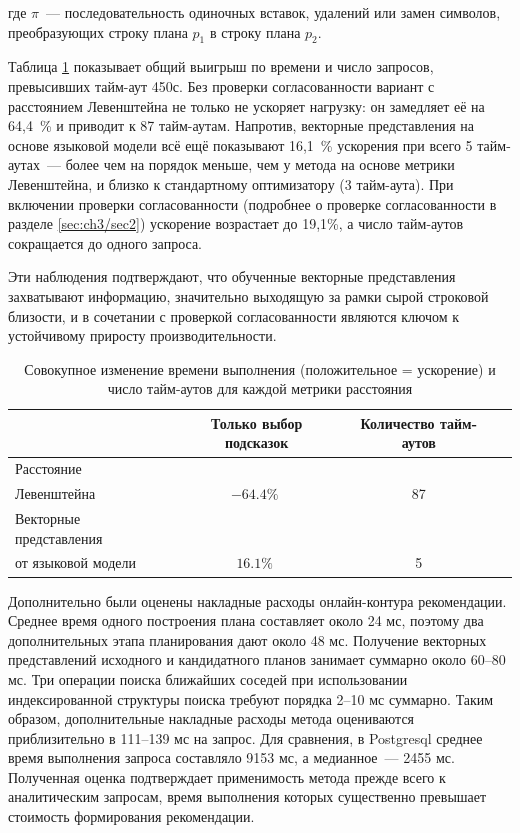 где $\pi$~--- последовательность одиночных вставок, удалений или замен символов, преобразующих строку плана $p_{1}$ в строку плана $p_{2}$.  

Таблица \ref{tab:ablation-latency} показывает общий выигрыш по времени и число запросов, превысивших тайм-аут 450с.
Без проверки согласованности вариант с расстоянием Левенштейна не только не ускоряет нагрузку: он замедляет её на 64{,}4~\% и приводит к 87 тайм-аутам.
Напротив, векторные представления на основе языковой модели всё ещё показывают 16{,}1~\% ускорения при всего 5 тайм-аутах~--- более чем на порядок меньше, чем у метода на основе метрики Левенштейна, и близко к стандартному оптимизатору (3 тайм-аута).
При включении проверки согласованности (подробнее о проверке согласованности в разделе \ref{sec:ch3/sec2}) ускорение возрастает до 19{,}1\%, а число тайм-аутов сокращается до одного запроса.

Эти наблюдения подтверждают, что обученные векторные представления захватывают информацию, значительно выходящую за рамки сырой строковой близости, и в сочетании с проверкой согласованности являются ключом к устойчивому приросту производительности.

\begin{table}[htbp]
  \centering

  \caption{Совокупное изменение времени выполнения (положительное = ускорение) и число тайм-аутов для каждой метрики расстояния}
  \begin{tabular}{lccc}
    \toprule
                     & Только выбор подсказок
                     & Количество тайм-аутов \\
    \midrule
    Расстояние \\ Левенштейна      & $-64.4\%\;$
                     & 87  \\[2pt]
    Векторные представления \\ от языковой модели   & $16.1\%\;$
                     & 5  \\
    \bottomrule
  \end{tabular}


    \label{tab:ablation-latency}
\end{table}

Дополнительно были оценены накладные расходы онлайн-контура рекомендации. Среднее время одного построения плана составляет около 24 мс, поэтому два дополнительных этапа планирования дают около 48 мс. Получение векторных представлений исходного и кандидатного планов занимает суммарно около 60--80 мс. Три операции поиска ближайших соседей при использовании индексированной структуры поиска требуют порядка 2--10 мс суммарно. Таким образом, дополнительные накладные расходы метода оцениваются приблизительно в 111--139 мс на запрос. Для сравнения, в Postgresql среднее время выполнения запроса составляло 9153 мс, а медианное~--- 2455 мс. Полученная оценка подтверждает применимость метода прежде всего к аналитическим запросам, время выполнения которых существенно превышает стоимость формирования рекомендации.

